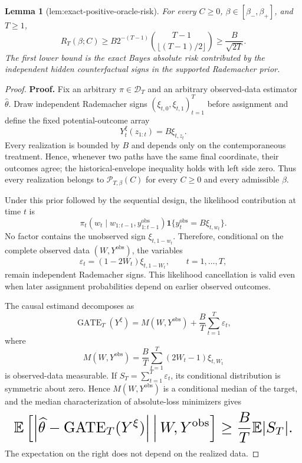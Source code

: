 \documentclass{article}
\newtheorem{lemma}{Lemma}
\begin{document}
\begin{lemma}[lem:exact-positive-oracle-risk]\label{lem:exact-positive-oracle-risk}
For every \(C\ge0\), \(\beta\in[\beta_-,\beta_+]\), and \(T\ge1\),
\[
R_T(\beta;C)\ge B2^{-(T-1)}\binom{T-1}{\lfloor(T-1)/2\rfloor}\ge\frac{B}{\sqrt{2T}}.
\]
The first lower bound is the exact Bayes absolute risk contributed by the independent hidden counterfactual signs in the supported Rademacher prior.
\end{lemma}
\begin{proof}
\textbf{Proof.} Fix an arbitrary \(\pi\in\mathcal D_T\) and an arbitrary observed-data estimator \(\widehat\theta\). Draw independent Rademacher signs \((\xi_{t,0},\xi_{t,1})_{t=1}^T\) before assignment and define the fixed potential-outcome array
\[
Y_t^\xi(z_{1:t})=B\xi_{t,z_t}.
\]
Every realization is bounded by \(B\) and depends only on the contemporaneous treatment. Hence, whenever two paths have the same final coordinate, their outcomes agree; the historical-envelope inequality holds with left side zero. Thus every realization belongs to \(\mathcal P_{T,\beta}(C)\) for every \(C\ge0\) and every admissible \(\beta\).

Under this prior followed by the sequential design, the likelihood contribution at time \(t\) is
\[
\pi_t(w_t\mid w_{1:t-1},y_{1:t-1}^{\mathrm{obs}})
\mathbf1\{y_t^{\mathrm{obs}}=B\xi_{t,w_t}\}.
\]
No factor contains the unobserved sign \(\xi_{t,1-w_t}\). Therefore, conditional on the complete observed data \((W,Y^{\mathrm{obs}})\), the variables
\[
\varepsilon_t=(1-2W_t)\xi_{t,1-W_t},\qquad t=1,\ldots,T,
\]
remain independent Rademacher signs. This likelihood cancellation is valid even when later assignment probabilities depend on earlier observed outcomes.

The causal estimand decomposes as
\[
\operatorname{GATE}_T(Y^\xi)
=M(W,Y^{\mathrm{obs}})+\frac BT\sum_{t=1}^T\varepsilon_t,
\]
where
\[
M(W,Y^{\mathrm{obs}})=\frac BT\sum_{t=1}^T(2W_t-1)\xi_{t,W_t}
\]
is observed-data measurable. If \(S_T=\sum_{t=1}^T\varepsilon_t\), its conditional distribution is symmetric about zero. Hence \(M(W,Y^{\mathrm{obs}})\) is a conditional median of the target, and the median characterization of absolute-loss minimizers gives
\[
\makebox[\linewidth][c]{\resizebox{0.98\linewidth}{!}{\(\displaystyle \mathbb E\left[\left|\widehat\theta-\operatorname{GATE}_T(Y^\xi)\right|\,\middle|\,W,Y^{\mathrm{obs}}\right]
\ge\frac BT\mathbb E|S_T|.\)}}
\]
The expectation on the right does not depend on the realized data.


\end{proof}
\end{document}
